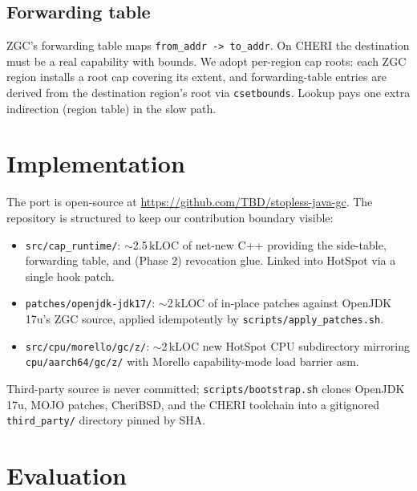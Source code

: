 \documentclass[acmsmall,nonacm]{acmart}
\begin{document}
\subsection{Forwarding table}
\label{sec:design:fwd}

ZGC's forwarding table maps \texttt{from\_addr -> to\_addr}. On CHERI
the destination must be a real capability with bounds. We adopt
per-region cap roots: each ZGC region installs a root cap covering
its extent, and forwarding-table entries are derived from the
destination region's root via \texttt{csetbounds}. Lookup pays one
extra indirection (region table) in the slow path.

\section{Implementation}
\label{sec:impl}

The port is open-source at \href{https://github.com/TBD/stopless-java-gc}
{https://github.com/TBD/stopless-java-gc}. The repository is structured
to keep our contribution boundary visible:

\begin{itemize}
\item \texttt{src/cap\_runtime/}: \mbox{$\sim$2.5\,kLOC} of net-new C++
      providing the side-table, forwarding table, and (Phase 2)
      revocation glue. Linked into HotSpot via a single hook patch.
\item \texttt{patches/openjdk-jdk17/}: \mbox{$\sim$2\,kLOC} of in-place
      patches against OpenJDK 17u's ZGC source, applied
      idempotently by \texttt{scripts/apply\_patches.sh}.
\item \texttt{src/cpu/morello/gc/z/}: \mbox{$\sim$2\,kLOC} new HotSpot
      CPU subdirectory mirroring \texttt{cpu/aarch64/gc/z/} with
      Morello capability-mode load barrier asm.
\end{itemize}

Third-party source is never committed; \texttt{scripts/bootstrap.sh}
clones OpenJDK 17u, MOJO patches, CheriBSD, and the CHERI toolchain
into a gitignored \texttt{third\_party/} directory pinned by SHA.

\section{Evaluation}
\label{sec:eval}
\end{document}
